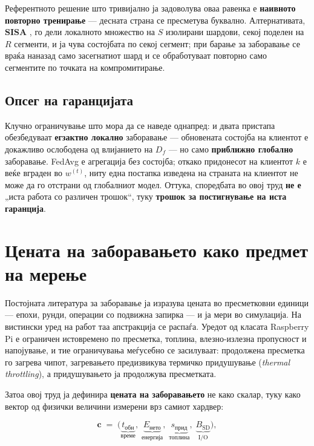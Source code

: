 Референтното решение што тривијално ја задоволува оваа равенка е \textbf{наивното повторно
тренирање} --- десната страна се пресметува буквално. Алтернативата, \textbf{SISA}
\cite{bourtoule2021sisa}, го дели локалното множество на $S$ изолирани шардови, секој
поделен на $R$ сегменти, и ја чува состојбата по секој сегмент; при барање за заборавање
се враќа наназад само засегнатиот шард и се обработуваат повторно само сегментите по
точката на компромитирање.

\subsection{Опсег на гаранцијата}

Клучно ограничување што мора да се наведе однапред: и двата пристапа обезбедуваат
\textbf{егзактно локално} заборавање --- обновената состојба на клиентот е докажливо ослободена
од влијанието на $D_f$ --- но само \textbf{приближно глобално} заборавање. FedAvg е агрегација
без состојба; откако придонесот на клиентот $k$ е веќе вграден во $w^{(t)}$, ниту една
постапка изведена на страната на клиентот не може да го отстрани од глобалниот модел.
Оттука, споредбата во овој труд \textbf{не е} „иста работа со различен трошок“, туку
\textbf{трошок за постигнување на иста гаранција}.

\section{Цената на заборавањето како предмет на мерење}

Постојната литература за заборавање ја изразува цената во пресметковни единици --- епохи,
рунди, операции со подвижна запирка --- и ја мери во симулација. На вистински уред на работ
таа апстракција се распаѓа. Уредот од класата Raspberry Pi е ограничен истовремено по
пресметка, топлина, влезно-излезна пропусност и напојување, и тие ограничувања меѓусебно
се засилуваат: продолжена пресметка го загрева чипот, загревањето предизвикува термичко
придушување (\emph{thermal throttling}), а придушувањето ја продолжува пресметката.

Затоа овој труд ја дефинира \textbf{цената на заборавањето} не како скалар, туку како вектор
од физички величини измерени врз самиот хардвер:

\[
\mathbf{c} \;=\; \bigl(\underbrace{t_{\text{обн}}}_{\text{време}},\;
\underbrace{E_{\text{нето}}}_{\text{енергија}},\;
\underbrace{s_{\text{прид}}}_{\text{топлина}},\;
\underbrace{B_{\text{SD}}}_{\text{I/O}}\bigr),
\]


